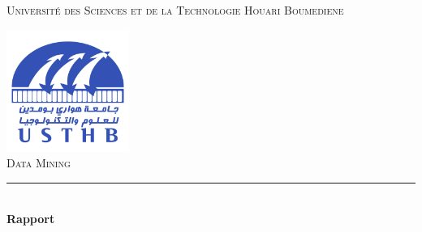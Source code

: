 
\begin{titlepage} %
	\newcommand{\HRule}{\rule{\linewidth}{0.5mm}} %
	
	\center %
	
	
	\baselineskip 
	\textsc{\LARGE Université des Sciences et de la Technologie Houari Boumediene}%

	
	\vfill
	\includegraphics[width=0.3\textwidth]{USTHB_Logo.png}\\[1cm] %
	 
	
	\textsc{\Large Data Mining }\\[0.5cm] %
	
	
	\HRule\\[0.4cm]
	\baselineskip 
	{\huge\bfseries Rapport\\ \reporttitle}\\[0.4cm] %
	

\end{titlepage}
